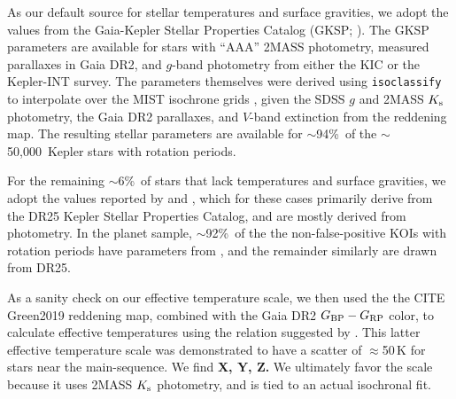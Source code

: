 \documentclass[11pt,twocolumn,tighten]{aastex63}
\newcommand{\nstarswithprot}{{$\sim$50{,}000}}
\newcommand{\fracstarswithprotwithbtwenty}{{$\sim$94\%}}
\newcommand{\fracstarswithprotwithoutbtwenty}{{$\sim$6\%}}
\newcommand{\frackoisnofpwithprotwithbtwenty}{{$\sim$92\%}}
\begin{document}
As our default source for stellar temperatures and surface gravities,
we adopt the values from the Gaia-Kepler Stellar Properties Catalog
(GKSP; \citealt{Berger_2020a_catalog}).  The GKSP parameters are
available for stars with ``AAA'' 2MASS photometry, measured parallaxes
in Gaia DR2,  and $g$-band photometry from either the KIC or the
Kepler-INT survey.  The parameters themselves were derived using
\texttt{isoclassify} \citep{2017ApJ...844..102H} to interpolate over
the MIST isochrone grids
\citep{2016ApJ...823..102C,2016ApJS..222....8D}, given the SDSS $g$
and 2MASS $K_{\rm s}$ photometry, the Gaia DR2 parallaxes, and
$V$-band extinction from the \citet{2018MNRAS.478..651G} reddening
map.  The resulting stellar parameters are available for
\fracstarswithprotwithbtwenty\ of the \nstarswithprot\ Kepler stars
with rotation periods.


For the remaining \fracstarswithprotwithoutbtwenty\ of stars that lack
temperatures and surface gravities, we adopt the values reported by
\citet{Santos_2019} and \citet{Santos_2021}, which for these cases
primarily derive from the \citet{Mathur_2017} DR25 Kepler Stellar
Properties Catalog, and are mostly derived from photometry.  In the
planet sample, \frackoisnofpwithprotwithbtwenty\ of the the
non-false-positive KOIs with rotation periods have parameters from
\citet{Berger_2020a_catalog}, and the remainder similarly are drawn
from DR25. 

As a sanity check on our effective temperature scale, we then used the 
the CITE Green2019 reddening map, combined with the Gaia DR2 $G_{\rm
BP}-G_{\rm RP}$ color, to calculate effective temperatures using the
relation suggested by \citet{Curtis_2020}.
This latter effective temperature scale was demonstrated to have a 
scatter of $\approx$50\,K for stars near the main-sequence.
We find {\bf X, Y, Z.}
We ultimately favor the \citet{Berger_2020a_catalog} scale
because it uses 2MASS $K_{\rm s}$ photometry, and is tied to an actual
isochronal fit.
\end{document}
